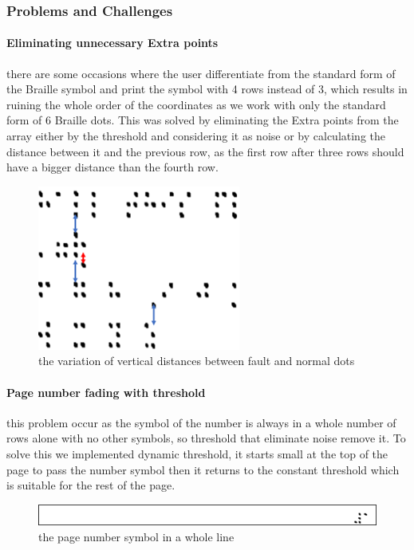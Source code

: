 \subsubsection{Problems and Challenges }
\paragraph{Eliminating unnecessary Extra points }\par
there are some occasions where the user differentiate from the standard form of the Braille symbol and print the symbol with 4 rows instead of 3, which results in ruining the whole order of the coordinates as we work with only the standard form of 6 Braille dots. This was solved by eliminating the Extra points from the array either by the threshold and considering it as noise or by calculating the distance between it and the previous row, as the first row after three rows should have a bigger distance than the fourth row.
\begin{figure}[!ht]
\centering
\includegraphics[width=0.35\linewidth]{6.1.10.png}
\caption{the variation of vertical distances between fault and normal dots}
\label{fig:the variation of vertical distances between fault and normal dots}
\end{figure} 

\paragraph{Page number fading with threshold}\par
this problem occur as the symbol of the number is always in a whole number of rows alone with no other symbols, so threshold that eliminate noise remove it. To solve this we implemented dynamic threshold, it starts small at the top of the page to pass the number symbol then it returns to the constant threshold which is suitable for the rest of the page.


\begin{figure}[!ht]
\centering
\includegraphics[width=0.8\linewidth]{6.1.11.png}
\caption{the page number symbol in a whole line }
\label{fig:the variation of vertical distances between fault and normal dots}
\end{figure} 








